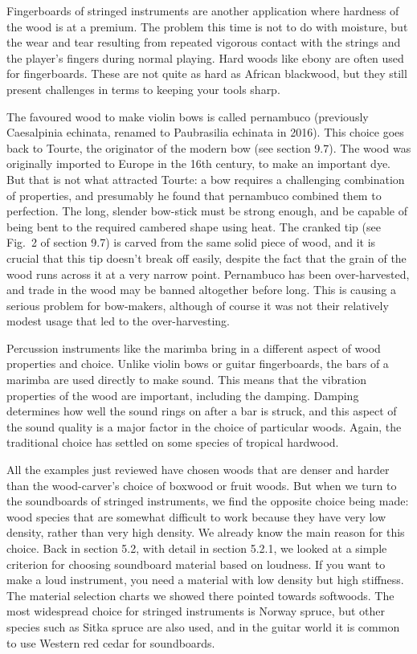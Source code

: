   Fingerboards of stringed instruments are another application where hardness 
  of the wood is at a premium. The problem this time is not to do with 
  moisture, but the wear and tear resulting from repeated vigorous contact with 
  the strings and the player’s fingers during normal playing. Hard woods like 
  ebony are often used for fingerboards. These are not quite as hard as African 
  blackwood, but they still present challenges in terms to keeping your tools 
  sharp. 

  The favoured wood to make violin bows is called pernambuco (previously 
  Caesalpinia echinata, renamed to Paubrasilia echinata in 2016). This choice 
  goes back to Tourte, the originator of the modern bow (see section 9.7). The 
  wood was originally imported to Europe in the 16th century, to make an 
  important dye. But that is not what attracted Tourte: a bow requires a 
  challenging combination of properties, and presumably he found that 
  pernambuco combined them to perfection. The long, slender bow-stick must be 
  strong enough, and be capable of being bent to the required cambered shape 
  using heat. The cranked tip (see Fig.\ 2 of section 9.7) is carved from the 
  same solid piece of wood, and it is crucial that this tip doesn't break off 
  easily, despite the fact that the grain of the wood runs across it at a very 
  narrow point. Pernambuco has been over-harvested, and trade in the wood may 
  be banned altogether before long. This is causing a serious problem for 
  bow-makers, although of course it was not their relatively modest usage that 
  led to the over-harvesting. 

  Percussion instruments like the marimba bring in a different aspect of wood 
  properties and choice. Unlike violin bows or guitar fingerboards, the bars of 
  a marimba are used directly to make sound. This means that the vibration 
  properties of the wood are important, including the damping. Damping 
  determines how well the sound rings on after a bar is struck, and this aspect 
  of the sound quality is a major factor in the choice of particular woods. 
  Again, the traditional choice has settled on some species of tropical 
  hardwood. 

  All the examples just reviewed have chosen woods that are denser and harder 
  than the wood-carver’s choice of boxwood or fruit woods. But when we turn to 
  the soundboards of stringed instruments, we find the opposite choice being 
  made: wood species that are somewhat difficult to work because they have very 
  low density, rather than very high density. We already know the main reason 
  for this choice. Back in section 5.2, with detail in section 5.2.1, we looked 
  at a simple criterion for choosing soundboard material based on loudness. If 
  you want to make a loud instrument, you need a material with low density but 
  high stiffness. The material selection charts we showed there pointed towards 
  softwoods. The most widespread choice for stringed instruments is Norway 
  spruce, but other species such as Sitka spruce are also used, and in the 
  guitar world it is common to use Western red cedar for soundboards. 

